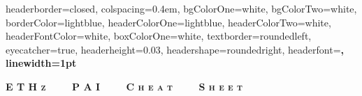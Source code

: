 \documentclass[landscape,a0paper,fontscale=0.285]{baposter} %
\begin{document}
\begin{poster}
{
headerborder=closed, %
colspacing=0.4em, %
bgColorOne=white, %
bgColorTwo=white, %
borderColor=lightblue, %
headerColorOne=lightblue, %
headerColorTwo=white, %
headerFontColor=white, %
boxColorOne=white, %
textborder=roundedleft, %
eyecatcher=true, %
headerheight=0.03\textheight, %
headershape=roundedright, %
headerfont=\Large\bf\textsc, %
linewidth=1pt %
}

{\bf\textsc{E T H z \ \ \ \ P A I \ \ \ \ C h e a t \ \ \ \ S h e e t}\vspace{0.0em}} %


\end{poster}
\end{document}
